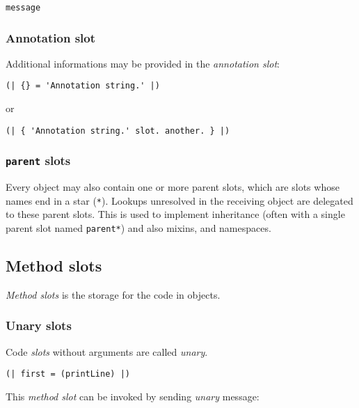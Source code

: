 \documentclass[10pt]{article}
\begin{document}
\begin{multicols*}{3}
{\begin{lstlisting}
message
\end{lstlisting}



\subsubsection{Annotation slot}

Additional informations may be provided in the \textit{annotation slot}:

\begin{lstlisting}
(| {} = 'Annotation string.' |)
\end{lstlisting}

or

\begin{lstlisting}
(| { 'Annotation string.' slot. another. } |)
\end{lstlisting}



\subsubsection{\texttt{parent} slots}
Every object may also contain one or more parent slots, which are slots whose names end in a star (\texttt{*}). Lookups unresolved in the receiving object are delegated to these parent slots. This is used to implement inheritance (often with a single parent slot named \texttt{parent*}) and also mixins, and namespaces.
}



\subsection{Method slots}

\textit{Method slots} is the storage for the code in objects.



\subsubsection{Unary slots}
Code \textit{slots} without arguments are called \textit{unary}.

\begin{lstlisting}
(| first = (printLine) |)
\end{lstlisting}

This \textit{method slot} can be invoked by sending \textit{unary} message:


\end{multicols*}
\end{document}
